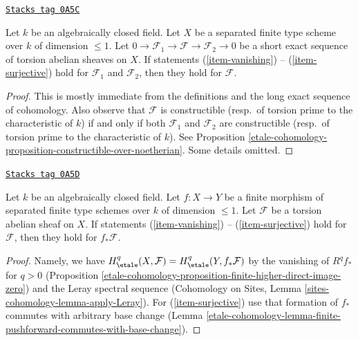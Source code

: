 \begin{lemma}
\label{etale-cohomology-lemma-ses-statements}
\href{https://stacks.math.columbia.edu/tag/0A5C}{\texttt{Stacks tag 0A5C}}

Let $k$ be an algebraically closed field. Let $X$ be a separated finite
type scheme over $k$ of dimension $\leq 1$. Let
$0 \to \mathcal{F}_1 \to \mathcal{F} \to \mathcal{F}_2 \to 0$
be a short exact sequence of torsion abelian sheaves on $X$.
If statements (\ref{item-vanishing}) -- (\ref{item-surjective}) hold
for $\mathcal{F}_1$ and $\mathcal{F}_2$, then they hold
for $\mathcal{F}$.
\end{lemma}

\begin{proof}
This is mostly immediate from the definitions and the long exact sequence
of cohomology. Also observe that $\mathcal{F}$ is constructible
(resp.\ of torsion prime to the characteristic of $k$) if and only if
both $\mathcal{F}_1$ and $\mathcal{F}_2$ are constructible
(resp.\ of torsion prime to the characteristic of $k$). See
Proposition \ref{etale-cohomology-proposition-constructible-over-noetherian}.
Some details omitted.
\end{proof}

\begin{lemma}
\label{etale-cohomology-lemma-finite-pushforward-statements}
\href{https://stacks.math.columbia.edu/tag/0A5D}{\texttt{Stacks tag 0A5D}}

Let $k$ be an algebraically closed field. Let $f : X \to Y$ be a
finite morphism of separated finite type schemes over $k$ of
dimension $\leq 1$. Let $\mathcal{F}$ be a torsion abelian sheaf on $X$.
If statements (\ref{item-vanishing}) -- (\ref{item-surjective}) hold
for $\mathcal{F}$, then they hold for $f_*\mathcal{F}$.
\end{lemma}

\begin{proof}
Namely, we have $H^q_\etale(X, \mathcal{F}) = H^q_\etale(Y, f_*\mathcal{F})$
by the vanishing of $R^qf_*$ for $q > 0$
(Proposition \ref{etale-cohomology-proposition-finite-higher-direct-image-zero}) and
the Leray spectral sequence
(Cohomology on Sites, Lemma \ref{sites-cohomology-lemma-apply-Leray}).
For (\ref{item-surjective}) use that formation of $f_*$ commutes with
arbitrary base change
(Lemma \ref{etale-cohomology-lemma-finite-pushforward-commutes-with-base-change}).
\end{proof}

